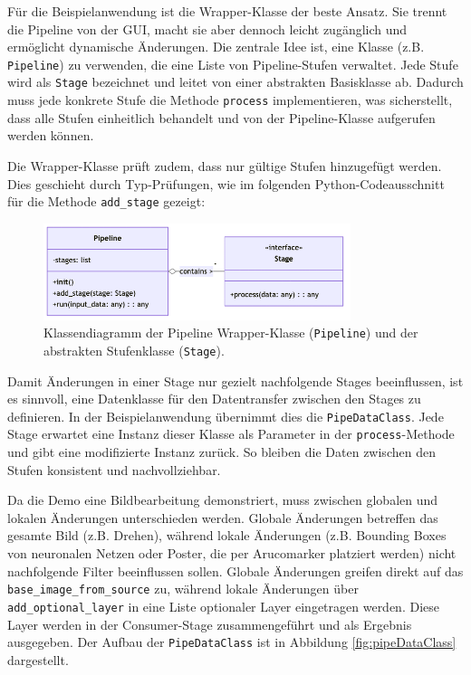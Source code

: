 \documentclass[10pt,a4paper]{article}
\begin{document}
Für die Beispielanwendung ist die Wrapper-Klasse der beste Ansatz. Sie trennt die Pipeline von der GUI, macht sie aber dennoch leicht zugänglich und ermöglicht dynamische Änderungen. Die zentrale Idee ist, eine Klasse (z.B. \texttt{Pipeline}) zu verwenden, die eine Liste von Pipeline-Stufen verwaltet. Jede Stufe wird als \texttt{Stage} bezeichnet und leitet von einer abstrakten Basisklasse ab. Dadurch muss jede konkrete Stufe die Methode \texttt{process} implementieren, was sicherstellt, dass alle Stufen einheitlich behandelt und von der Pipeline-Klasse aufgerufen werden können.

Die Wrapper-Klasse prüft zudem, dass nur gültige Stufen hinzugefügt werden. Dies geschieht durch Typ-Prüfungen, wie im folgenden Python-Codeausschnitt für die Methode \texttt{add\_stage} gezeigt:

\begin{figure}[htbp]
    \centering
    \includegraphics[width=0.8\textwidth]{img/wrapper.png}
    \caption{Klassendiagramm der Pipeline Wrapper-Klasse (\texttt{Pipeline}) und der abstrakten Stufenklasse (\texttt{Stage}).}
    \label{fig:wrapper}
\end{figure}

Damit Änderungen in einer Stage nur gezielt nachfolgende Stages beeinflussen, ist es sinnvoll, eine Datenklasse für den Datentransfer zwischen den Stages zu definieren. In der Beispielanwendung übernimmt dies die \texttt{PipeDataClass}. Jede Stage erwartet eine Instanz dieser Klasse als Parameter in der \texttt{process}-Methode und gibt eine modifizierte Instanz zurück. So bleiben die Daten zwischen den Stufen konsistent und nachvollziehbar.

Da die Demo eine Bildbearbeitung demonstriert, muss zwischen globalen und lokalen Änderungen unterschieden werden. Globale Änderungen betreffen das gesamte Bild (z.B. Drehen), während lokale Änderungen (z.B. Bounding Boxes von neuronalen Netzen oder Poster, die per Arucomarker platziert werden) nicht nachfolgende Filter beeinflussen sollen. Globale Änderungen greifen direkt auf das \texttt{base\_image\_from\_source} zu, während lokale Änderungen über \texttt{add\_optional\_layer} in eine Liste optionaler Layer eingetragen werden. Diese Layer werden in der Consumer-Stage zusammengeführt und als Ergebnis ausgegeben. Der Aufbau der \texttt{PipeDataClass} ist in Abbildung \ref{fig:pipeDataClass} dargestellt.
\end{document}

